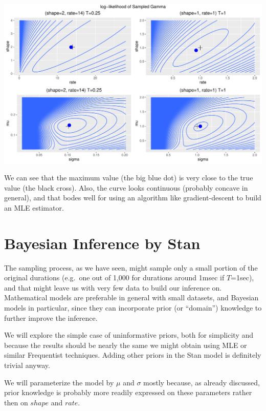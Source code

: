 \documentclass[]{article}
\begin{document}
\begin{center}\includegraphics[width=1.0\textwidth]{sampling_event_duration_files/figure-latex/likelihood.explore-1} \end{center}

We can see that the maximum value (the big blue dot) is very close to
the true value (the black cross). Also, the curve looks continuous
(probably concave in general), and that bodes well for using an
algorithm like gradient-descent to build an MLE estimator.

\hypertarget{bayesian-inference-by-stan}{%
\section{Bayesian Inference by Stan}\label{bayesian-inference-by-stan}}

The sampling process, as we have seen, might sample only a small portion
of the original durations (e.g.~one out of 1,000 for durations around
1msec if \(T\)=1sec), and that might leave us with very few data to
build our inference on. Mathematical models are preferable in general
with small datasets, and Bayesian models in particular, since they can
incorporate prior (or ``domain'') knowledge to further improve the
inference.

We will explore the simple case of uninformative priors, both for
simplicity and because the results should be nearly the same we might
obtain using MLE or similar Frequentist techniques. Adding other priors
in the Stan model is definitely trivial anyway.

We will parameterize the model by \(\mu\) and \(\sigma\) mostly because,
as already discussed, prior knowledge is probably more readily expressed
on these parameters rather then on \(shape\) and \(rate\).
\end{document}
